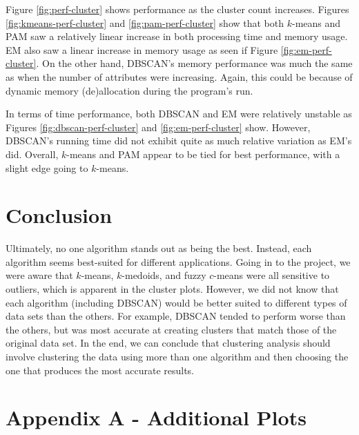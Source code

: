 \documentclass[11pt,letterpaper]{article}
\begin{document}
Figure \ref{fig:perf-cluster} shows performance as the cluster count increases.  Figures \ref{fig:kmeans-perf-cluster} and \ref{fig:pam-perf-cluster} show that both $k$-means and PAM saw a relatively linear increase in both processing time and memory usage.  EM also saw a linear increase in memory usage as seen if Figure \ref{fig:em-perf-cluster}.  On the other hand, DBSCAN's memory performance was much the same as when the number of attributes were increasing.  Again, this could be because of dynamic memory (de)allocation during the program's run.

In terms of time performance, both DBSCAN and EM were relatively unstable as Figures \ref{fig:dbscan-perf-cluster} and \ref{fig:em-perf-cluster} show.  However, DBSCAN's running time did not exhibit quite as much relative variation as EM's did.  Overall, $k$-means and PAM appear to be tied for best performance, with a slight edge going to $k$-means.

\section{Conclusion}
Ultimately, no one algorithm stands out as being the best.  Instead, each algorithm seems best-suited for different applications.  Going in to the project, we were aware that $k$-means, $k$-medoids, and fuzzy $c$-means were all sensitive to outliers, which is apparent in the cluster plots.  However, we did not know that each algorithm (including DBSCAN) would be better suited to different types of data sets than the others.  For example, DBSCAN tended to perform worse than the others, but was most accurate at creating clusters that match those of the original data set.  In the end, we can conclude that clustering analysis should involve clustering the data using more than one algorithm and then choosing the one that produces the most accurate results.




\newpage
\appendix
\section{Appendix A - Additional Plots}
\end{document}
